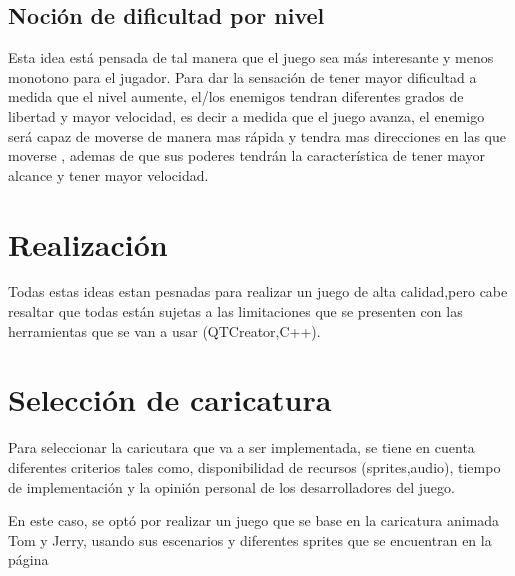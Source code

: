 \documentclass{article}
\begin{document}
\subsection{Noción de dificultad por nivel}
Esta idea está pensada de tal manera que el juego sea más interesante y menos monotono para el jugador. Para dar la sensación de tener mayor dificultad a medida que el nivel aumente, el/los enemigos tendran diferentes grados de libertad y mayor velocidad, es decir a medida que el juego avanza, el enemigo será capaz de moverse de manera mas rápida y tendra mas direcciones en las que moverse , ademas de que sus poderes tendrán la característica de tener mayor alcance y tener mayor velocidad. 

\section{Realización}
Todas estas ideas estan pesnadas para realizar un juego de alta calidad,pero cabe resaltar que todas están sujetas a las limitaciones que se presenten con las herramientas que se van a usar (QTCreator,C++).

\section{Selección de caricatura}
Para seleccionar la caricutara que va a ser implementada, se tiene en cuenta diferentes criterios tales como, disponibilidad de recursos (sprites,audio), tiempo de implementación y la opinión personal de los desarrolladores del juego.

En este caso, se optó por realizar un juego que se base en la caricatura animada Tom y Jerry, usando sus escenarios y diferentes sprites que se encuentran en la página \cite{sprite}



\\

\end{document}
